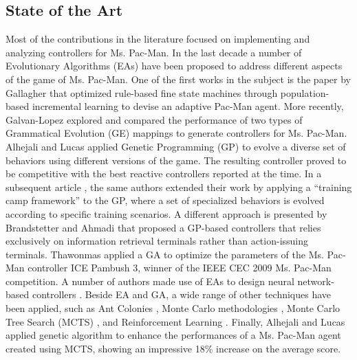 \documentclass[journal]{IEEEtran}
\begin{document}
\subsection{State of the Art}
Most of the contributions in the literature focused on implementing and analyzing controllers for Ms. Pac-Man. In the last decade a number of Evolutionary Algorithms (EAs) have been proposed to address different aspects of the game of Ms. Pac-Man. One of the first works in the subject is the paper by Gallagher \cite{Gallagher03} that optimized rule-based fine state machines through population-based incremental learning to devise an adaptive Pac-Man agent. More recently, Galvan-Lopez \cite{Galvan-Lopez10} explored and compared the performance of two types of Grammatical Evolution (GE) mappings to generate controllers for Ms. Pac-Man. Alhejali and Lucas \cite{Alhejali10} applied Genetic Programming (GP) to evolve a diverse set of behaviors using different versions of the game. The resulting controller proved to be competitive with the best reactive controllers reported at the time. In a subsequent article \cite{AlhejaliLucas11}, the same authors extended their work by applying a ``training camp framework'' to the GP, where a set of specialized behaviors is evolved according to specific training scenarios. A different approach is presented by Brandstetter and Ahmadi \cite{Brandstetter12} that proposed a GP-based controllers that relies exclusively on information retrieval terminals rather than action-issuing terminals.  Thawonmas \cite{Thawonmas10} applied a GA to optimize the parameters of the Ms. Pac-Man controller ICE Pambush 3, winner of the IEEE CEC 2009 Ms. Pac-Man competition. A number of authors made use of EAs to design neural network-based controllers \cite{Lucas05,Burrow09,Keunhyun10}. Beside EA and GA, a wide range of other techniques have been applied, such as  Ant Colonies \cite{Emilio2010}, Monte Carlo methodologies \cite{Tong2010,Tong2011}, Monte Carlo Tree Search (MCTS) \cite{Samothrakis2011, Ikehata2011}, and Reinforcement Learning \cite{Bom2013}. Finally, Alhejali and Lucas \cite{Alhejali2013} applied genetic algorithm to enhance the performances of a Ms. Pac-Man agent created using MCTS, showing an impressive 18\% increase on the average score. 
\end{document}
